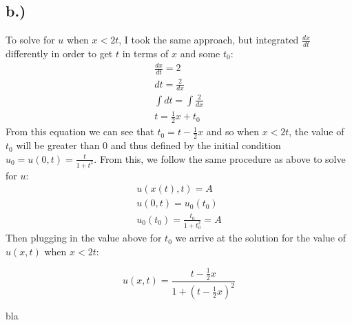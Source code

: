 \documentclass{article}
\begin{document}
\subsection*{b.)}
To solve for $u$ when $x < 2t$, I took the same approach, but integrated $\frac{dx}{dt}$ differently in order to get $t$ in terms of $x$ and some $t_0$:
\begin{equation}
\begin{aligned}
\frac{dx}{dt} = 2\\
dt = \frac{2}{dx}\\
\int dt = \int \frac{2}{dx}\\
t = \frac{1}{2}x + t_0
\end{aligned}
\end{equation}
From this equation we can see that $t_0 = t - \frac{1}{2}x$ and so when $x < 2t$, the value of $t_0$ will be greater than $0$ and thus defined by the initial condition $u_0 = u(0,t) = \frac{t}{1+t^2}$. From this, we follow the same procedure as above to solve for $u$:
\begin{equation}
\begin{aligned}
u(x(t), t) = A\\
u(0, t) = u_0(t_0)\\
u_0(t_0) = \frac{t_0}{1+t_0^2} = A
\end{aligned}
\end{equation}
Then plugging in the value above for $t_0$ we arrive at the solution for the value of $u(x, t)$ when $x < 2t$:
\begin{tcolorbox}[minipage,colback=white,arc=0pt,outer arc=0pt]
\begin{equation}
u(x, t) =  \frac{t - \frac{1}{2}x}{1+(t - \frac{1}{2}x)^2}
\end{equation}
\end{tcolorbox}
bla
\end{document}
